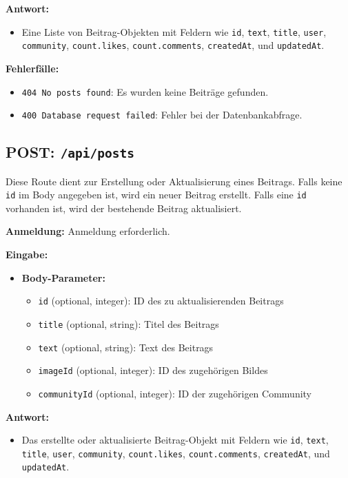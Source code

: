 \documentclass[a4paper,12pt]{article}
\begin{document}
\textbf{Antwort:}
\begin{itemize}
    \item Eine Liste von Beitrag-Objekten mit Feldern wie
        \texttt{id},
        \texttt{text},
        \texttt{title},
        \texttt{user},
        \texttt{community},
        \texttt{count.likes},
        \texttt{count.comments},
        \texttt{createdAt},
        und \texttt{updatedAt}.
\end{itemize}

\textbf{Fehlerfälle:}
\begin{itemize}
    \item \texttt{404 No posts found}:
        Es wurden keine Beiträge gefunden.
    \item \texttt{400 Database request failed}:
        Fehler bei der Datenbankabfrage.
\end{itemize}

\subsection{POST: \texttt{/api/posts}}

Diese Route dient zur Erstellung oder Aktualisierung eines Beitrags. Falls
keine \texttt{id} im Body angegeben ist, wird ein neuer Beitrag erstellt. Falls
eine \texttt{id} vorhanden ist, wird der bestehende Beitrag aktualisiert.

\textbf{Anmeldung:} Anmeldung erforderlich.

\textbf{Eingabe:}
\begin{itemize}
    \item \textbf{Body-Parameter:}
    \begin{itemize}
        \item \texttt{id} (optional, integer):
            ID des zu aktualisierenden Beitrags
        \item \texttt{title} (optional, string):
            Titel des Beitrags
        \item \texttt{text} (optional, string):
            Text des Beitrags
        \item \texttt{imageId} (optional, integer):
            ID des zugehörigen Bildes
        \item \texttt{communityId} (optional, integer):
            ID der zugehörigen Community
    \end{itemize}
\end{itemize}

\textbf{Antwort:}
\begin{itemize}
    \item Das erstellte oder aktualisierte Beitrag-Objekt mit Feldern wie
        \texttt{id},
        \texttt{text},
        \texttt{title},
        \texttt{user},
        \texttt{community},
        \texttt{count.likes},
        \texttt{count.comments},
        \texttt{createdAt},
        und \texttt{updatedAt}.
\end{itemize}
\end{document}
